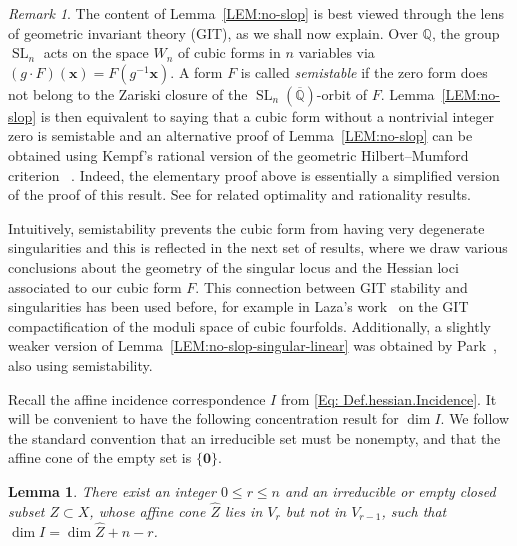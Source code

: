 \documentclass[a4paper,11pt, twoside,reqno]{amsart}
\theoremstyle{plain}
\newtheorem{lemma}[thm]{Lemma}
\theoremstyle{definition}
\theoremstyle{remark}
\newtheorem{rem}[thm]{Remark}
\newcommand{\bfx}{\bm{x}}
\newcommand{\QQ}{\mathbb{Q}}
\renewcommand{\le}{\leqslant}
\newcommand{\Qbar}{\overline{\mathbb{Q}}}
\newcommand{\SL}{\operatorname{SL}}
\newcommand{\cone}{\widehat}
\numberwithin{equation}{section}
\begin{document}
\begin{rem}
\label{RMK:GIT-view}
The content of Lemma~\ref{LEM:no-slop} is best viewed through the lens of geometric invariant theory (GIT), as we shall now explain. Over $\QQ$, the group $\SL_n$ acts on the space $W_n$ of cubic forms in $n$ variables via
$(g\cdot F)(\bfx)=F(g^{-1}\bfx)$. A form $F$ is called \emph{semistable} if the zero form does not belong to the Zariski closure of the
$\SL_n(\Qbar)$-orbit of $F$.  Lemma~\ref{LEM:no-slop} is then equivalent to saying that a cubic form without a nontrivial integer zero is semistable and an alternative proof of Lemma~\ref{LEM:no-slop} can be obtained using Kempf's rational version of the geometric Hilbert--Mumford criterion ~\cite[Corollary~4.3]{Kem78}. Indeed, the elementary proof above is essentially a simplified version of the proof of this result. See \cite[\S4]{BMRT} for related optimality and rationality results.

Intuitively, semistability prevents the cubic form from having very degenerate singularities and this is reflected in the next set of results, where we draw various conclusions about the geometry of the singular locus and the Hessian loci associated to our cubic form $F$. This connection between GIT stability and singularities has been used before, for example in Laza's work~\cite{Laz09} on the GIT compactification of the moduli space of cubic fourfolds. Additionally, a slightly weaker version of Lemma~\ref{LEM:no-slop-singular-linear} was obtained by Park~\cite[Lemma~7.2]{Par25}, also using semistability.  
\end{rem}





Recall the affine incidence correspondence $I$
from \eqref{Eq: Def.hessian.Incidence}.
It will be convenient to have the following concentration result for $\dim I$.
We follow the standard convention that an irreducible set must be nonempty,
and that the affine cone of the empty set is $\{\bm0\}$.

\begin{lemma}
\label{LEM:hessian-concentration}
There exist an integer $0\le r\le n$
and an irreducible or empty closed subset $Z \subset X$,
whose affine cone $\cone Z$ lies in $V_r$ but not in $V_{r-1}$,
such that $\dim I = \dim \cone Z + n-r$.
\end{lemma}
\end{document}
